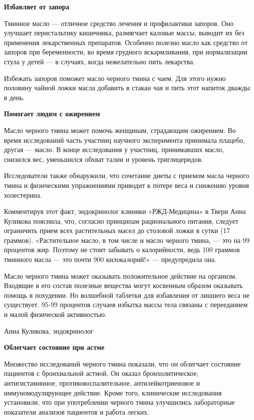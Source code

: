 \textbf{Избавляет от запора}

Тминное масло — отличное средство лечения и профилактики запоров. Оно улучшает перистальтику кишечника, размягчает каловые массы, выводит их без применения лекарственных препаратов. Особенно полезно масло как средство от запоров при беременности, во время грудного вскармливания, при нормализации стула у детей — в случаях, когда нежелательно пить лекарства.

Избежать запоров поможет масло черного тмина с чаем. Для этого нужно половину чайной ложки масла добавить в стакан чая и пить этот напиток дважды в день.

\textbf{Помогает людям с ожирением}

Масло черного тмина может помочь женщинам, страдающим ожирением. Во время исследований часть участниц научного эксперимента принимала плацебо, другая — масло. В конце исследования у участниц, принимавших масло, снизился вес, уменьшился обхват талии и уровень триглицеридов.

Исследователи также обнаружили, что сочетание диеты с приемом масла черного тмина и физическими упражнениями приводит к потере веса и снижению уровня холестерина.

Комментируя этот факт, эндокринолог клиники «РЖД-Медицина» в Твери Анна Куликова пояснила, что, согласно принципам рационального питания, следует ограничить прием всех растительных масел до столовой ложки в сутки (17 граммов). «Растительное масло, в том числе и масло черного тмина, — это на 99 процентов жир. Поэтому не стоит забывать о калорийности, ведь 100 граммов тминного масла — это почти 900 килокалорий!» — предупредила она.


\begin{fancyquotes}
    Масло черного тмина может оказывать положительное действие на организм. Входящие в его состав полезные вещества могут косвенным образом оказывать помощь в похудении. Но волшебной таблетки для избавления от лишнего веса не существует. 95-99 процентов случаев избытка массы тела связаны с перееданием и малой физической активностью.\\

    \begin{flushright}
        Анна Куликова, эндокринолог
    \end{flushright}
\end{fancyquotes}

\textbf{Облегчает состояние при астме}

Множество исследований черного тмина показали, что он облегчает состояние пациентов с бронхиальной астмой. Он оказал бронхолитическое, антигистаминное, противовоспалительное, антилейкотриеновое и иммуномодулирующее действие. Кроме того, клинические исследования установили, что при употреблении черного тмина улучшились лабораторные показатели анализов пациентов и работа легких.

